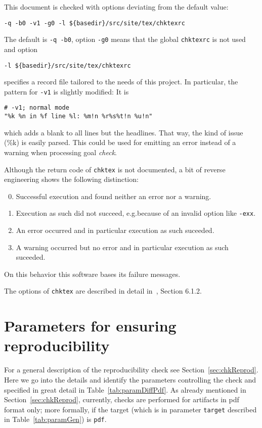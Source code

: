 This document is checked with options deviating from the default value: 
%
\begin{verbatim}
-q -b0 -v1 -g0 -l ${basedir}/src/site/tex/chktexrc
\end{verbatim}
%
The default is \texttt{-q -b0}, 
option \texttt{-g0} means that the global \texttt{chktexrc} is not used 
and option 
%
\begin{verbatim}
-l ${basedir}/src/site/tex/chktexrc
\end{verbatim}
%
specifies a record file tailored to the needs of this project. 
In particular, the pattern for \texttt{-v1} is slightly modified: 
It is 
%
\begin{verbatim}
# -v1; normal mode
"%k %n in %f line %l: %m!n %r%s%t!n %u!n"
\end{verbatim}
%
which adds a blank to all lines but the headlines. 
That way, the kind of issue (\%k) is easily parsed. 
This could be used for emitting an error instead of a warning 
when processing goal \emph{check}. 

Although the return code of \texttt{chktex} is not documented, 
a bit of reverse engineering shows the following distinction: 
%
\begin{enumerate}\setcounter{enumi}{-1}
  \item Successful execution and found neither an error nor a warning. 
  \item Execution as such did not succeed, 
  e.g.\@ because of an invalid option like \texttt{-exx}. 
  \item An error occurred and in particular execution as such suceeded. 
  \item A warning occurred but no error and in particular execution as such suceeded. 
\end{enumerate}

On this behavior this software bases its failure messages. 

The options of \texttt{chktex} are described in detail 
in~\cite{ChkTeX22}, Section 6.1.2. %


\section{Parameters for ensuring reproducibility}\label{sec:paramRepro}

For a general description of the reproducibility check 
see Section~\ref{sec:chkReprod}. 
Here we go into the details and identify the parameters 
controlling the check 
and specified in great detail in Table~\ref{tab:paramDiffPdf}. 
As already mentioned in Section~\ref{sec:chkReprod}, 
currently, checks are performed for artifacts in pdf format only; 
more formally, if the target 
(which is in parameter \texttt{target} described in Table~\ref{tab:paramGen}) 
is \texttt{pdf}. 

